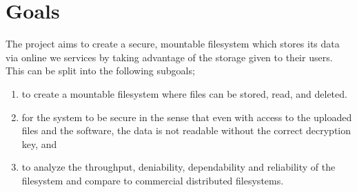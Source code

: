 
\section{Goals}


The project aims to create a secure, mountable filesystem which stores its data via online we services by taking advantage of the storage given to their users. This can be split into the following subgoals;
\begin{enumerate}
\item to create a mountable filesystem where files can be stored, read, and deleted. %
\item for the system to be secure in the sense that even with access to the uploaded files and the software, the data is not readable without the correct decryption key, and %
\item to analyze the throughput, deniability, dependability and reliability of the filesystem and compare to commercial distributed filesystems.
\end{enumerate}

